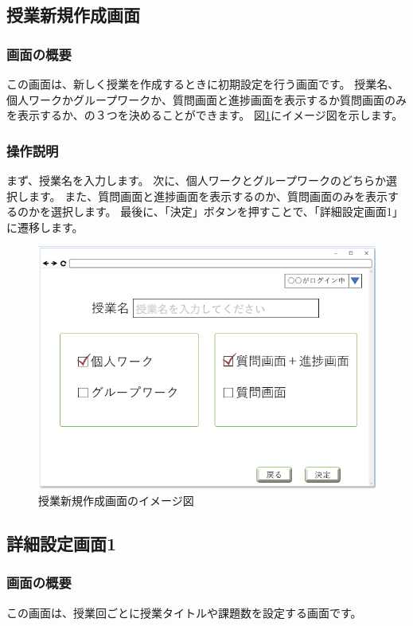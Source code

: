 \newpage

\subsection{授業新規作成画面}
\subsubsection{画面の概要}
この画面は、新しく授業を作成するときに初期設定を行う画面です。
授業名、個人ワークかグループワークか、質問画面と進捗画面を表示するか質問画面のみを表示するか、の３つを決めることができます。
図\ref{fig:10}にイメージ図を示します。

\subsubsection{操作説明}
まず、授業名を入力します。
次に、個人ワークとグループワークのどちらか選択します。
また、質問画面と進捗画面を表示するのか、質問画面のみを表示するのかを選択します。
最後に、「決定」ボタンを押すことで、「詳細設定画面1」に遷移します。

\begin{figure}[htbp]
  \begin{center}
    \includegraphics[width=0.8\linewidth,clip]{./img/10.png}
    \caption{授業新規作成画面のイメージ図}\label{fig:10}
  \end{center}
\end{figure}

\newpage

\subsection{詳細設定画面1}
\subsubsection{画面の概要}
この画面は、授業回ごとに授業タイトルや課題数を設定する画面です。

